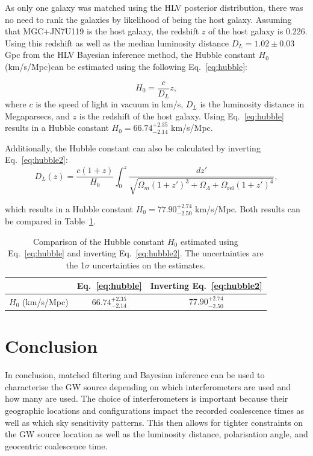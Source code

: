 \documentclass[11pt,a4paper]{article}
\begin{document}
As only one galaxy was matched using the HLV posterior distribution, there was no need to rank the galaxies by likelihood of being the host galaxy. Assuming that MGC+JN7U119 is the host galaxy, the redshift $z$ of the host galaxy is 0.226. Using this redshift as well as the median luminosity distance $D_L = 1.02 \pm 0.03$ Gpc from the HLV Bayesian inference method, the Hubble constant $H_0$ (km/s/Mpc)can be estimated using the following Eq.~\ref{eq:hubble}:

\begin{equation}
    H_0 = \frac{c}{D_L}{z},
    \label{eq:hubble}
\end{equation}
where $c$ is the speed of light in vacuum in km/s, $D_L$ is the luminosity distance in Megaparsecs, and $z$ is the redshift of the host galaxy. Using Eq.~\ref{eq:hubble} results in a Hubble constant $H_0=66.74^{+2.35}_{-2.14}$ km/s/Mpc.

Additionally, the Hubble constant can also be calculated by inverting Eq.~\ref{eq:hubble2}:
\begin{equation}
    D_L(z) = \frac{c(1 + z)}{H_0} \int_0^z \frac{dz'}{\sqrt{\Omega_m (1 + z')^3 + \Omega_\Lambda + \Omega_\mathrm{rel}(1+z')^4}},
    \label{eq:hubble2}
\end{equation}

which results in a Hubble constant $H_0=77.90^{+2.74}_{-2.50}$ km/s/Mpc. Both results can be compared in Table~\ref{tab:hubble}.

\begin{table}[h]
    \centering
    \begin{tabular}{c|c|c}
    & Eq.~\ref{eq:hubble} & Inverting Eq.~\ref{eq:hubble2} \\
    \hline
    $H_0$ (km/s/Mpc) & $66.74^{+2.35}_{-2.14}$ & $77.90^{+2.74}_{-2.50}$ \\
    \end{tabular}
    \caption{Comparison of the Hubble constant $H_0$ estimated using Eq.~\ref{eq:hubble} and inverting Eq.~\ref{eq:hubble2}. The uncertainties are the 1$\sigma$ uncertainties on the estimates.}
    \label{tab:hubble}
\end{table}

\clearpage
\section{Conclusion}
\label{sec:conclusion}
In conclusion, matched filtering and Bayesian inference can be used to characterise the GW source depending on which interferometers are used and how many are used. The choice of interferometers is important because their geographic locations and configurations impact the recorded coalescence times as well as which sky sensitivity patterns. This then allows for tighter constraints on the GW source location as well as the luminosity distance, polarisation angle, and geocentric coalescence time. 
\end{document}
